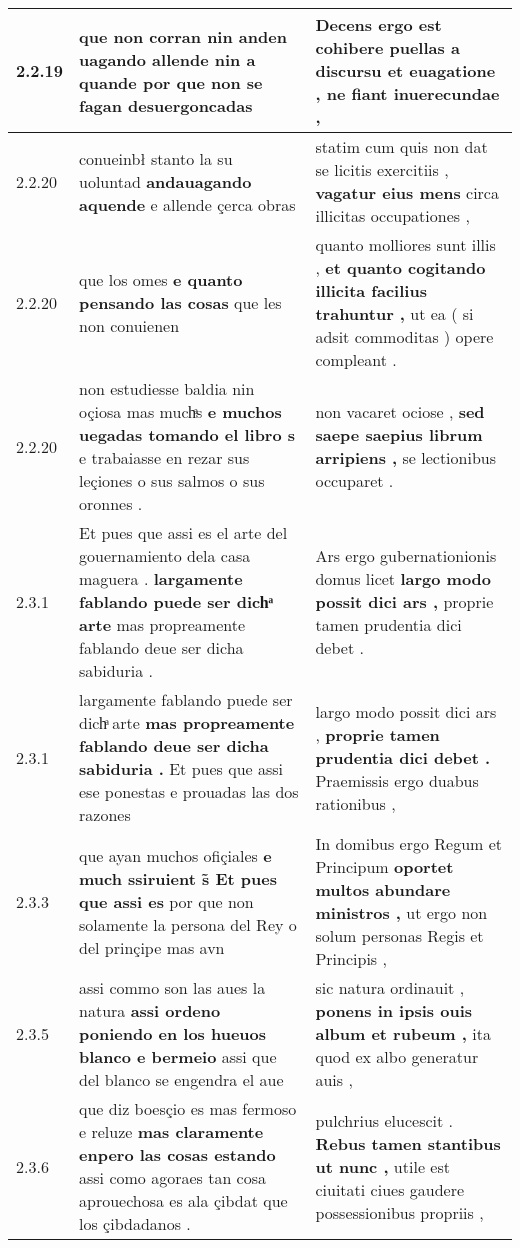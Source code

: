 \begin{tabular}{|p{1cm}|p{6.5cm}|p{6.5cm}|}
2.2.19 & que non corran \textbf{ nin anden uagando allende } nin a quande por que non se fagan desuergoncadas & Decens ergo est cohibere puellas \textbf{ a discursu et euagatione , } ne fiant inuerecundae , \\\hline
2.2.20 & conueinbł stanto la su uoluntad \textbf{ andauagando aquende } e allende çerca obras & statim cum quis non dat se licitis exercitiis , \textbf{ vagatur eius mens } circa illicitas occupationes , \\\hline
2.2.20 & que los omes \textbf{ e quanto pensando las cosas } que les non conuienen & quanto molliores sunt illis , \textbf{ et quanto cogitando illicita facilius trahuntur , } ut ea ( si adsit commoditas ) opere compleant . \\\hline
2.2.20 & non estudiesse baldia nin oçiosa mas muchͣs \textbf{ e muchos uegadas tomando el libro s } e trabaiasse en rezar sus leçiones o sus salmos o sus oronnes . & non vacaret ociose , \textbf{ sed saepe saepius librum arripiens , } se lectionibus occuparet . \\\hline
2.3.1 & Et pues que assi es el arte del gouernamiento dela casa maguera . \textbf{ largamente fablando puede ser dichͣ arte } mas propreamente fablando deue ser dicha sabiduria . & Ars ergo gubernationionis domus licet \textbf{ largo modo possit dici ars , } proprie tamen prudentia dici debet . \\\hline
2.3.1 & largamente fablando puede ser dichͣ arte \textbf{ mas propreamente fablando deue ser dicha sabiduria . } Et pues que assi ese ponestas e prouadas las dos razones & largo modo possit dici ars , \textbf{ proprie tamen prudentia dici debet . } Praemissis ergo duabus rationibus , \\\hline
2.3.3 & que ayan muchos ofiçiales \textbf{ e much ssiruient s̃ Et pues que assi es } por que non solamente la persona del Rey o del prinçipe mas avn & In domibus ergo Regum et Principum \textbf{ oportet multos abundare ministros , } ut ergo non solum personas Regis et Principis , \\\hline
2.3.5 & assi commo son las aues la natura \textbf{ assi ordeno poniendo en los hueuos blanco e bermeio } assi que del blanco se engendra el aue & sic natura ordinauit , \textbf{ ponens in ipsis ouis album et rubeum , } ita quod ex albo generatur auis , \\\hline
2.3.6 & que diz boesçio es mas fermoso e reluze \textbf{ mas claramente enpero las cosas estando } assi como agoraes tan cosa aprouechosa es ala çibdat que los çibdadanos . & pulchrius elucescit . \textbf{ Rebus tamen stantibus ut nunc , } utile est ciuitati ciues gaudere possessionibus propriis , \\\hline

\end{tabular}
